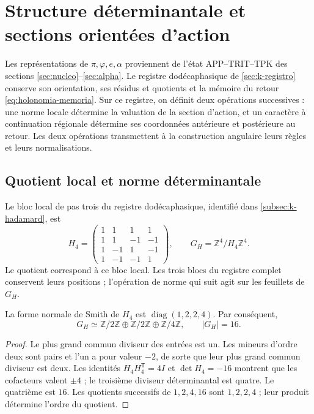 \section{Structure déterminantale et sections orientées d’action}
\label{iv:action:section}

Les représentations de \(\pi,\varphi,e,\alpha\) proviennent de l’état
APP--TRIT--TPK des sections
\ref{sec:nucleo}--\ref{sec:alpha}. Le registre dodécaphasique de
\ref{sec:k-registro} conserve son orientation, ses résidus et
quotients et la mémoire du retour
\eqref{eq:holonomia-memoria}. Sur ce registre, on définit deux opérations
successives : une norme locale détermine la valuation de la section
d’action, et un caractère à continuation régionale détermine ses
coordonnées antérieure et postérieure au retour. Les deux opérations
transmettent à la construction angulaire leurs règles et leurs normalisations.

\subsection{Quotient local et norme déterminantale}
\label{iv:action:determinantal}

Le bloc local de pas trois du registre dodécaphasique, identifié
dans \ref{subsec:k-hadamard}, est
\begin{equation}
 H_4=\begin{pmatrix}
 1&1&1&1\\
 1&1&-1&-1\\
 1&-1&1&-1\\
 1&-1&-1&1
 \end{pmatrix},
 \qquad G_H=\mathbb Z^4/H_4\mathbb Z^4.
 \label{iv:action:h4}
\end{equation}
Le quotient correspond à ce bloc local. Les trois blocs du
registre complet conservent leurs positions ; l’opération de norme
qui suit agit sur les feuillets de \(G_H\).

\begin{lemma}
\label{iv:action:smith}
La forme normale de Smith de \(H_4\) est
\(\operatorname{diag}(1,2,2,4)\). Par conséquent,
\[
 G_H\simeq\mathbb Z/2\mathbb Z\oplus\mathbb Z/2\mathbb Z
       \oplus\mathbb Z/4\mathbb Z,\qquad |G_H|=16.
\]
\end{lemma}
\begin{proof}
Le plus grand commun diviseur des entrées est un. Les mineurs
d’ordre deux sont pairs et l’un a pour valeur \(-2\), de sorte que leur plus grand
commun diviseur est deux. Les identités
\(H_4H_4^{\mathsf T}=4I\) et \(\det H_4=-16\) montrent que les
cofacteurs valent \(\pm4\) ; le troisième diviseur déterminantal est
quatre. Le quatrième est \(16\). Les quotients successifs de
\(1,2,4,16\) sont \(1,2,2,4\) ; leur produit détermine l’ordre
du quotient.
\end{proof}

